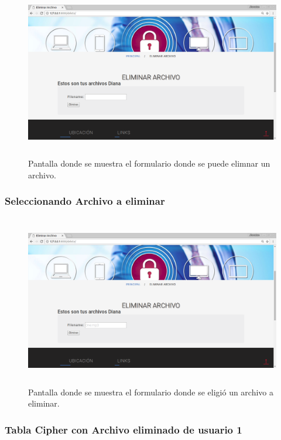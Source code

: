 			\begin{figure}[H]
			\centering
			\includegraphics[width=14cm, height=7.5cm]{./images/Implementacion/EliminarArchivo.png}
			\caption{Pantalla donde se muestra el formulario donde se puede elimnar un archivo.}
			\label{fig:6-1-36} 
			\end{figure}

\subsubsection{Seleccionando Archivo a eliminar}

			\begin{figure}[H]
			\centering
			\includegraphics[width=14cm, height=7.5cm]{./images/Implementacion/EliminarArchivoSeleccionado.png}
			\caption{Pantalla donde se muestra el formulario donde se eligió un archivo a eliminar.}
			\label{fig:6-1-37} 
			\end{figure}

\subsubsection{Tabla Cipher con Archivo eliminado de usuario 1}

